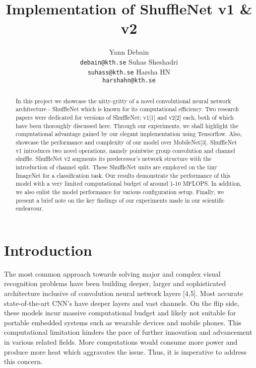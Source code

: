 \documentclass{article}
\title{Implementation of ShuffleNet v1 \& v2}
\author{%
  Yann Debain \\   \texttt{debain@kth.se}
  \And Suhas Sheshadri \\   \texttt{suhass@kth.se}
  \And Harsha HN \\   \texttt{harshahn@kth.se}
}
\begin{document}

\maketitle

\begin{abstract}
  In this project we showcase the nitty-gritty of a novel convolutional neural network architecture - ShuffleNet which is known for its computational efficiency. Two research papers were dedicated for versions of ShuffleNet; v1[1] and v2[2] each, both of which have been thoroughly discussed here. Through our experiments, we shall highlight the computational advantage gained by our elegant implementation using Tensorflow. Also, showcase the performance and complexity of our model over MobileNet[3]. ShuffleNet v1 introduces two novel operations, namely pointwise group convolution and channel shuffle. ShuffleNet v2 augments its predecessor's network structure with the introduction of channel split. These ShuffleNet units are employed on the tiny ImageNet for a classification task. Our results demonstrate the performance of this model with a very limited computational budget of around 1-10 MFLOPS. In addition, we also enlist the model performance for various configuration setup. Finally, we present a brief note on the key findings of our experiments made in our scientific endeavour. 
  
  
\end{abstract}

\section{Introduction}
The most common approach towards solving major and complex visual recognition problems have been building deeper, larger and sophisticated architecture inclusive of convolution neural network layers [4,5]. Most accurate state-of-the-art CNN's have deeper layers and vast channels. On the flip side, these models incur massive computational budget and likely not suitable for portable embedded systems such as wearable devices and mobile phones. This computational limitation hinders the pace of further innovation and advancement in various related fields. More computations would consume more power and produce more heat which aggravates the issue. Thus, it is imperative to address this concern.
\end{document}
